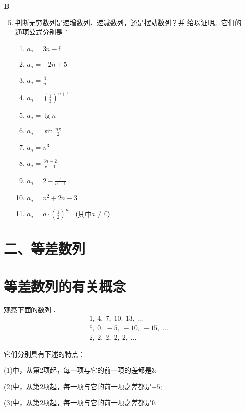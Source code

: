 \begin{center}
    \bfseries B
\end{center}

\begin{enumerate}\setcounter{enumi}{4}
    \item 判断无穷数列是递增数列、递减数列，还是摆动数列？并
    给以证明。它们的通项公式分别是：
\begin{multicols}{2}
\begin{enumerate}[(1)]
    \item $a_n=3n-5$
    \item $a_n=-2n+5$
    \item $a_n=\frac{4}{n}$
    \item $a_n=\left(\frac{1}{3}\right)^{n+1}$
    \item $a_n=\lg n$
    \item $a_n=\sin\frac{n\pi}{2}$
    \item $a_n=n^3$
    \item $a_n=\frac{3n-2}{n+1}$
    \item $a_n=2-\frac{3}{n+1}$
    \item $a_n=n^2+2n-3$
    \item $a_n=a\cdot \left(\frac{1}{2}\right)^n$ （其中$a\ne 0$）
\end{enumerate}
\end{multicols}
\end{enumerate}

\section*{二、等差数列}

\section{等差数列的有关概念}


观察下面的数列：
\begin{align}
&1,\; 4,\; 7,\; 10,\; 13,\; \ldots \tag{1}\\
&5,\; 0,\; -5,\; -10,\; -15,\; \ldots \tag{2}\\
&2,\; 2,\; 2,\; 2,\; 2,\; \ldots \tag{3}
\end{align}

它们分别具有下述的特点：

(1)中，从第2项起，每一项与它的前一项的差都是3;

(2)中，从第2项起，每一项与它的前一项之差都是$-5$;

(3)中，从第2项起，每一项与它的前一项之差都是0.

